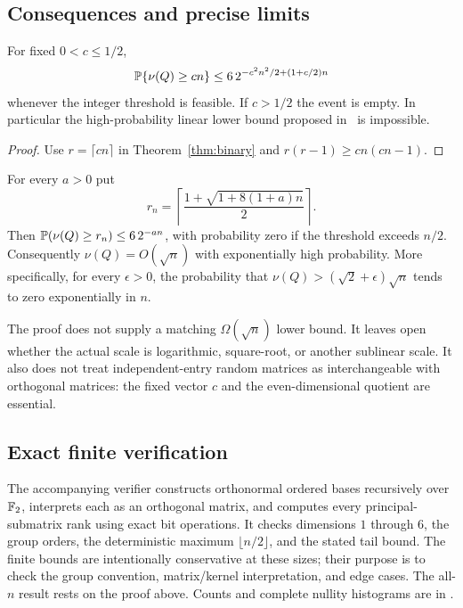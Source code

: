 \subsection{Consequences and precise limits}

\begin{corollary}\label{cor:no-linear}
For fixed $0<c\le1/2$,
\[
 \mathbb P\{\nu(Q)\ge cn\}
 \le 6\,2^{-c^2n^2/2+(1+c/2)n}
\]
whenever the integer threshold is feasible. If $c>1/2$ the event is empty. In particular the high-probability linear lower bound proposed in~\cite{vaas} is impossible.
\end{corollary}
\begin{proof}
Use $r=\lceil cn\rceil$ in Theorem~\ref{thm:binary} and
$r(r-1)\ge cn(cn-1)$.
\end{proof}

\begin{corollary}
For every $a>0$ put
\[
 r_n=\left\lceil\frac{1+\sqrt{1+8(1+a)n}}2\right\rceil.
\]
Then $\mathbb P(\nu(Q)\ge r_n)\le6\,2^{-an}$, with probability zero if the threshold exceeds $n/2$. Consequently $\nu(Q)=O(\sqrt n)$ with exponentially high probability. More specifically, for every $\epsilon>0$, the probability that
$\nu(Q)>(\sqrt2+\epsilon)\sqrt n$ tends to zero exponentially in $n$.
\end{corollary}

The proof does not supply a matching $\Omega(\sqrt n)$ lower bound. It leaves open whether the actual scale is logarithmic, square-root, or another sublinear scale. It also does not treat independent-entry random matrices as interchangeable with orthogonal matrices: the fixed vector $c$ and the even-dimensional quotient are essential.

\subsection{Exact finite verification}

The accompanying verifier constructs orthonormal ordered bases recursively over $\mathbb F_2$, interprets each as an orthogonal matrix, and computes every principal-submatrix rank using exact bit operations. It checks dimensions $1$ through $6$, the group orders, the deterministic maximum $\lfloor n/2\rfloor$, and the stated tail bound. The finite bounds are intentionally conservative at these sizes; their purpose is to check the group convention, matrix/kernel interpretation, and edge cases. The all-$n$ result rests on the proof above. Counts and complete nullity histograms are in .
